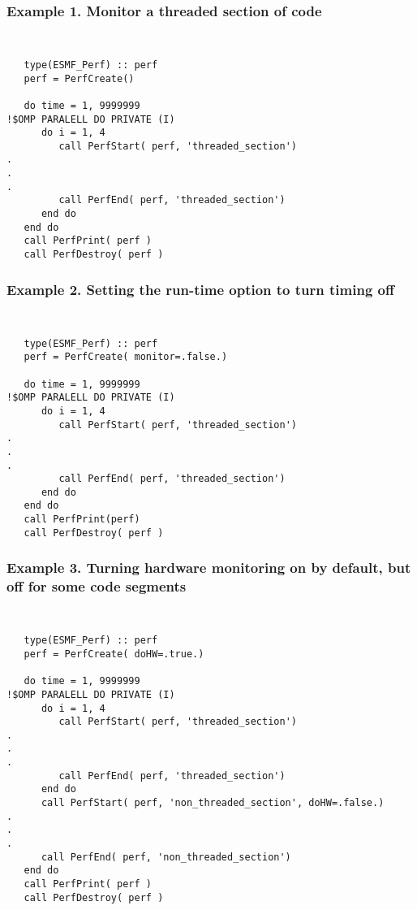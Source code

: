 %



\subsubsection{Example 1. Monitor a threaded section of code}
{\tt
\begin{verbatim}
   type(ESMF_Perf) :: perf
   perf = PerfCreate()

   do time = 1, 9999999
!$OMP PARALELL DO PRIVATE (I)
      do i = 1, 4
         call PerfStart( perf, 'threaded_section')
.
.
.
         call PerfEnd( perf, 'threaded_section')
      end do
   end do
   call PerfPrint( perf )
   call PerfDestroy( perf )
\end{verbatim}
}
\subsubsection{Example 2. Setting the run-time option to turn timing off}
{\tt
\begin{verbatim}
   type(ESMF_Perf) :: perf
   perf = PerfCreate( monitor=.false.)

   do time = 1, 9999999
!$OMP PARALELL DO PRIVATE (I)
      do i = 1, 4
         call PerfStart( perf, 'threaded_section')
.
.
.
         call PerfEnd( perf, 'threaded_section')
      end do
   end do
   call PerfPrint(perf)
   call PerfDestroy( perf )
\end{verbatim}
}
\subsubsection{Example 3. Turning hardware monitoring on by default, but off 
for some code segments}
{\tt
\begin{verbatim}
   type(ESMF_Perf) :: perf
   perf = PerfCreate( doHW=.true.)

   do time = 1, 9999999
!$OMP PARALELL DO PRIVATE (I)
      do i = 1, 4
         call PerfStart( perf, 'threaded_section')
.
.
.
         call PerfEnd( perf, 'threaded_section')
      end do
      call PerfStart( perf, 'non_threaded_section', doHW=.false.)
.
.
.
      call PerfEnd( perf, 'non_threaded_section')
   end do
   call PerfPrint( perf )
   call PerfDestroy( perf )
\end{verbatim}
}
